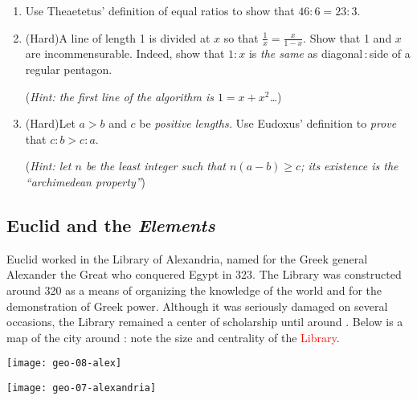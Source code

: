 \begin{exercises}{}{}
\begin{enumerate}
	  \item%
		Use Theaetetus' definition of equal ratios to show that $46:6=23:3$.
	  
	  \item%
	  (Hard)\lstsp A line of length 1 is divided at $x$ so that $\frac 1x=\frac x{1-x}$. Show that 1 and $x$ are incommensurable. Indeed, show that $1:x$ is \emph{the same} as diagonal\,:\,side of a regular pentagon.\par
	  (\emph{Hint: the first line of the algorithm is $1=x+x^2$\ldots})
	  
	  \item%
	  (Hard)\lstsp Let $a>b$ and $c$ be \emph{positive lengths.} Use Eudoxus' definition to \emph{prove} that $c:b>c:a$.\par
	  (\emph{Hint: let $n$ be the least integer such that $n(a-b)\ge c$; its existence is the ``archimedean property''})
	\end{enumerate}
\end{exercises}


\clearpage



\subsection{Euclid and the \emph{Elements}}

\begin{minipage}[t]{0.70\linewidth}\vspace{-8pt}
Euclid worked in the Library of Alexandria, named for the Greek general Alexander the Great who conquered Egypt in 323\BC. The Library was constructed around 320\BC{} as a means of organizing the knowledge of the world and for the demonstration of Greek power. Although it was seriously damaged on several occasions, the Library remained a center of scholarship until around . Below is a map of the city around : note the size and centrality of the \textcolor{red}{Library}.
\end{minipage}\hfill
\begin{minipage}[t]{0.29\linewidth}\vspace{-25pt}
\flushright\texttt{[image: geo-08-alex]}
\end{minipage}\par

\begin{center}
\texttt{[image: geo-07-alexandria]}
\end{center}

